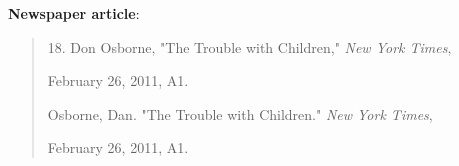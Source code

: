 \textbf{Newspaper article}:
\begin{quote}
 
\hspace{.4in}18. Don Osborne, "The Trouble with Children," \emph{New York Times}, 

February 26, 2011, A1.

\medskip

Osborne, Dan. "The Trouble with Children." \emph{New York Times}, 

\hspace{.4in}February  26, 2011, A1.
\end{quote}


